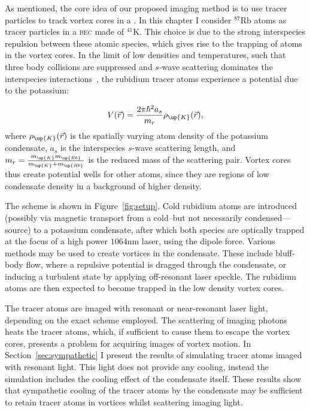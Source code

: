 As mentioned, the core idea of our proposed imaging method is to use tracer particles to track vortex cores in a \bec. In this chapter I consider $^{87}$Rb atoms as tracer particles in a \textsc{bec} made of $^{41}$K. This choice is due to the strong interspecies repulsion between these atomic species, which gives rise to the trapping of atoms in the vortex cores. In the limit of low densities and temperatures, such that three body collisions are suppressed and $s$-wave scattering dominates the interspecies interactions~\cite[p 120]{leggett_quantum_2006}, the rubidium tracer atoms experience a potential due to the potassium:

\begin{equation}
V(\vec{r}) = \frac{2\pi\hbar^2 a_s}{m_r}\rho_\up{K}(\vec{r}),
\end{equation}
where $\rho_\up{K}(\vec{r})$ is the spatially varying atom density of the potassium condensate, $a_s$ is the interspecies $s$-wave scattering length, and
$m_r = \frac{m_\up{K}m_\up{Rb}}{m_\up{K} + m_\up{Rb}}$ is the reduced mass of the scattering pair. Vortex cores thus create potential wells for other atoms, since they are regions of low condensate density in a background of higher density.

The scheme is shown in Figure~\ref{fig:setup}. Cold rubidium atoms are introduced (possibly via magnetic transport from a cold--but not necessarily condensed---source) to a potassium condensate, after which both species are optically trapped at the focus of a high power $1064$nm laser, using the dipole force. Various methods may be used to create vortices in the condensate. These include bluff-body flow, where a repulsive potential is dragged through the condensate, or inducing a turbulent state by applying off-resonant laser speckle. The rubidium atoms are then expected to become trapped in the low density vortex cores.

The tracer atoms are imaged with resonant or near-resonant laser light, depending on the exact scheme employed. The scattering of imaging photons heats the tracer atoms, which, if sufficient to cause them to escape the vortex cores, presents a problem for acquiring images of vortex motion. In Section~\ref{sec:sympathetic} I present the results of simulating tracer atoms imaged with resonant light. This light does not provide any cooling, instead the simulation includes the cooling effect of the condensate itself. These results show that sympathetic cooling of the tracer atoms by the condensate may be sufficient to retain tracer atoms in vortices whilst scattering imaging light.

